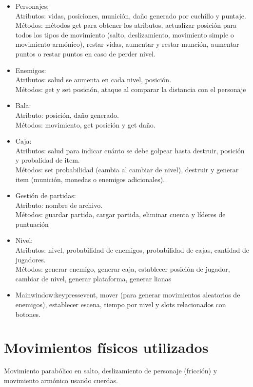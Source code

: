 \documentclass{article}
\begin{document}
\begin{itemize}
    \item Personajes: \\Atributos: vidas, posiciones, munición, daño generado por cuchillo y puntaje. \\Métodos: métodos get para obtener los atributos, actualizar posición para todos los tipos de movimiento (salto, deslizamiento, movimiento simple o movimiento armónico), restar vidas, aumentar y restar munción, aumentar puntos o restar puntos en caso de perder nivel.
    \item Enemigos:\\
    Atributos: salud se aumenta en cada nivel, posición. \\Métodos: get y set posición, ataque al comparar la distancia con el personaje 
    \item Bala: \\Atributo: posición, daño generado. \\Métodos: movimiento, get posición y get daño.
    \item Caja: \\Atributos: salud para indicar cuánto se debe golpear hasta destruir, posición y probalidad de item. \\Métodos: set probabilidad (cambia al cambiar de nivel), destruir y generar item (munición, monedas o enemigos adicionales).
    \item Gestión de partidas: \\Atributo: nombre de archivo. \\Métodos: guardar partida, cargar partida, eliminar cuenta y líderes de puntuación
    \item Nivel: \\Atributos: nivel, probabilidad de enemigos, probabilidad de cajas, cantidad de jugadores. \\Métodos: generar enemigo, generar caja, establecer posición de jugador, cambiar de nivel, generar plataforma, generar lianas 
    \item Mainwindow:keypressevent, mover (para generar movimientos aleatorios de enemigos), establecer escena, tiempo por nivel y slots relacionados con botones.
\end{itemize}

\section{Movimientos físicos utilizados}
Movimiento parabólico en salto, deslizamiento de personaje (fricción) y movimiento armónico  usando cuerdas.
\end{document}
